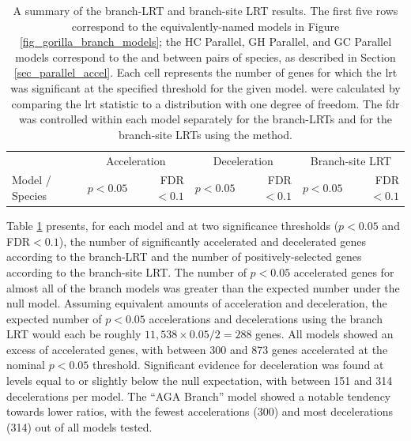\begin{table}
\centering \scriptsize
\begin{tabular}{lrrrrrr}
\toprule
 & \multicolumn{2}{c}{Acceleration} & \multicolumn{2}{c}{Deceleration} & \multicolumn{2}{c}{Branch-site LRT} \\
Model / Species & $p<0.05$ & FDR$<0.1$ & $p<0.05$ & FDR$<0.1$ & $p<0.05$ & FDR$<0.1$ \\
  \midrule


\bottomrule
\end{tabular}
\caption{A summary of the branch-LRT and branch-site LRT results. The
  first five rows correspond to the equivalently-named models in
  Figure \ref{fig_gorilla_branch_models}; the HC Parallel, GH
  Parallel, and GC Parallel models correspond to the \lrtmin and
  \lrtmax between pairs of species, as described in Section
  \ref{sec_parallel_accel}. Each cell represents the number of genes
  for which the \ac{lrt} was significant at the specified threshold
  for the given model. \pvs were calculated by comparing the \ac{lrt}
  statistic to a \chisq distribution with one degree of freedom. The
  \acf{fdr} was controlled within each model separately for the
  branch-LRTs and for the branch-site LRTs using the
  \citet{Benjamini1995} method.}
\label{table_gorilla_lrt_results}
\end{table}

Table \ref{table_gorilla_lrt_results} presents, for each model and at
two significance thresholds ($p<0.05$ and FDR$<0.1$), the number of
significantly accelerated and decelerated genes according to the
branch-LRT and the number of positively-selected genes according to
the branch-site LRT. The number of $p<0.05$ accelerated genes for
almost all of the branch models was greater than the expected number
under the null model. Assuming equivalent amounts of acceleration and
deceleration, the expected number of $p<0.05$ accelerations and
decelerations using the branch LRT would each be roughly
$11,538\times0.05/2=288$ genes. All models showed an excess of
accelerated genes, with between 300 and 873 genes accelerated at the
nominal $p<0.05$ threshold. Significant evidence for deceleration was
found at levels equal to or slightly below the null expectation, with
between 151 and 314 decelerations per model. The ``AGA Branch'' model
showed a notable tendency towards lower \dnds ratios, with the fewest
accelerations (300) and most decelerations (314) out of all models
tested.

